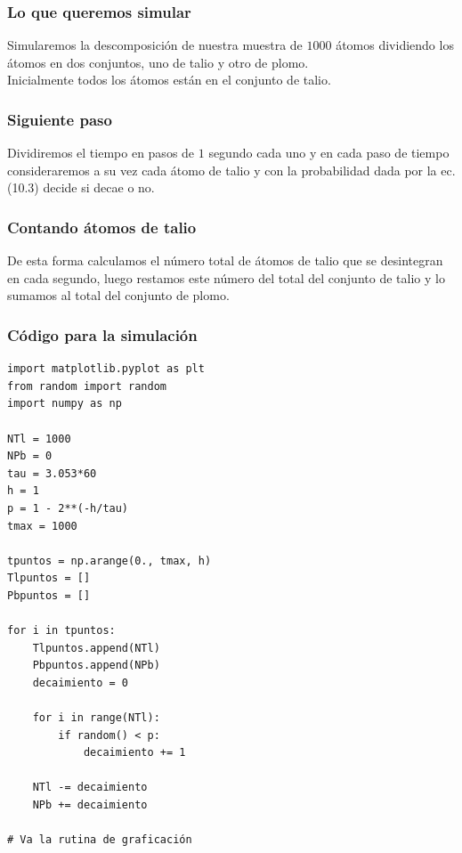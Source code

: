 \documentclass[12pt]{beamer}
\begin{document}
\begin{frame}
\frametitle{Lo que queremos simular}
Simularemos la descomposición de nuestra muestra de $1000$ átomos dividiendo los átomos en dos conjuntos, uno de talio y otro de plomo.
\\
\bigskip
\pause
Inicialmente todos los átomos están en el conjunto de talio.
\end{frame}
\begin{frame}
\frametitle{Siguiente paso}
Dividiremos el tiempo en pasos de $1$ segundo cada uno y en cada paso de tiempo consideraremos a su vez cada átomo de talio y con la probabilidad dada por la ec. (10.3) decide si decae o no.
\end{frame}
\begin{frame}
\frametitle{Contando átomos de talio}
De esta forma calculamos el número total de átomos de talio que se desintegran en cada segundo, \pause luego restamos este número del total del conjunto de talio y lo sumamos al total del conjunto de plomo.
\end{frame}
\begin{frame}
\frametitle{Código para la simulación}
\begin{lstlisting}[caption=Código para representar la desintegración radioactiva]
import matplotlib.pyplot as plt
from random import random
import numpy as np

NTl = 1000
NPb = 0
tau = 3.053*60
h = 1
p = 1 - 2**(-h/tau)
tmax = 1000

tpuntos = np.arange(0., tmax, h)
Tlpuntos = []
Pbpuntos = []

for i in tpuntos:
    Tlpuntos.append(NTl)
    Pbpuntos.append(NPb)
    decaimiento = 0
    
    for i in range(NTl):
        if random() < p:
            decaimiento += 1
    
    NTl -= decaimiento
    NPb += decaimiento

# Va la rutina de graficación
\end{lstlisting}
\end{frame}
\end{document}
